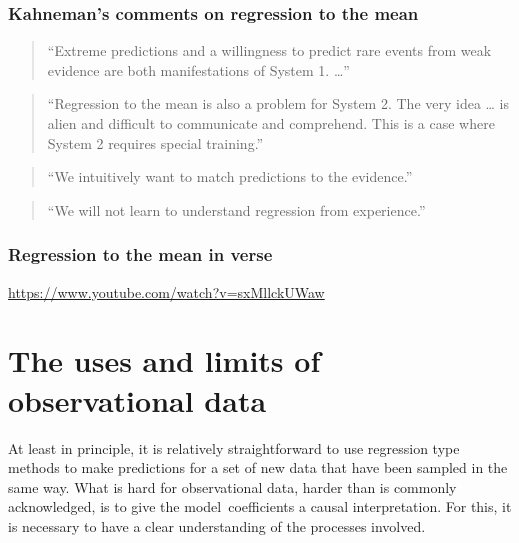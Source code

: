 \documentclass[
  10pt,
  b5paper]{book}
\begin{document}
\hypertarget{kahnemans-comments-on-regression-to-the-mean}{%
\subsection*{Kahneman's comments on regression to the mean}\label{kahnemans-comments-on-regression-to-the-mean}}

\begin{quote}
``Extreme predictions and a willingness to predict rare events from weak evidence are both manifestations of System 1. \ldots{}''
\end{quote}

\begin{quote}
``Regression to the mean is also a problem for System 2. The very idea \ldots{} is alien and difficult to communicate and comprehend. This is a case where System 2 requires special training.''
\end{quote}

\begin{quote}
``We intuitively want to match predictions to the evidence.''
\end{quote}

\begin{quote}
``We will not learn to understand regression from experience.''
\end{quote}

\hypertarget{regression-to-the-mean-in-verse}{%
\subsection*{Regression to the mean in verse}\label{regression-to-the-mean-in-verse}}

\url{https://www.youtube.com/watch?v=sxMllckUWaw}

\hypertarget{the-uses-and-limits-of-observational-data}{%
\chapter{The uses and limits of observational data}\label{the-uses-and-limits-of-observational-data}}

At least in principle, it is relatively straightforward to use
regression type methods to make predictions for a set of new
data that have been sampled in the same way. What is hard for
observational data, harder than is commonly acknowledged,
is to give the model~coefficients a causal interpretation.
For this, it is necessary to have a clear understanding of the
processes involved.
\end{document}
